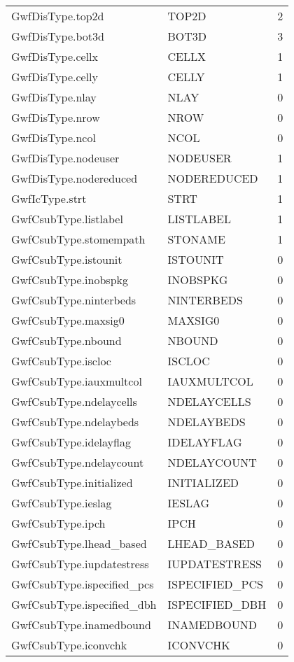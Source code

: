 \begin{longtable}{p{6cm} p{4cm} p{2cm} }
GwfDisType.top2d &  TOP2D & 2 \\ 
GwfDisType.bot3d &  BOT3D & 3 \\ 
GwfDisType.cellx &  CELLX & 1 \\ 
GwfDisType.celly &  CELLY & 1 \\ 
GwfDisType.nlay &  NLAY & 0 \\ 
GwfDisType.nrow &  NROW & 0 \\ 
GwfDisType.ncol &  NCOL & 0 \\ 
GwfDisType.nodeuser &  NODEUSER & 1 \\ 
GwfDisType.nodereduced &  NODEREDUCED & 1 \\ 
GwfIcType.strt &  STRT & 1 \\ 
GwfCsubType.listlabel &  LISTLABEL & 1 \\ 
GwfCsubType.stomempath &  STONAME & 1 \\ 
GwfCsubType.istounit &  ISTOUNIT & 0 \\ 
GwfCsubType.inobspkg &  INOBSPKG & 0 \\ 
GwfCsubType.ninterbeds &  NINTERBEDS & 0 \\ 
GwfCsubType.maxsig0 &  MAXSIG0 & 0 \\ 
GwfCsubType.nbound &  NBOUND & 0 \\ 
GwfCsubType.iscloc &  ISCLOC & 0 \\ 
GwfCsubType.iauxmultcol &  IAUXMULTCOL & 0 \\ 
GwfCsubType.ndelaycells &  NDELAYCELLS & 0 \\ 
GwfCsubType.ndelaybeds &  NDELAYBEDS & 0 \\ 
GwfCsubType.idelayflag &  IDELAYFLAG & 0 \\ 
GwfCsubType.ndelaycount &  NDELAYCOUNT & 0 \\ 
GwfCsubType.initialized &  INITIALIZED & 0 \\ 
GwfCsubType.ieslag &  IESLAG & 0 \\ 
GwfCsubType.ipch &  IPCH & 0 \\ 
GwfCsubType.lhead\_based &  LHEAD\_BASED & 0 \\ 
GwfCsubType.iupdatestress &  IUPDATESTRESS & 0 \\ 
GwfCsubType.ispecified\_pcs &  ISPECIFIED\_PCS & 0 \\ 
GwfCsubType.ispecified\_dbh &  ISPECIFIED\_DBH & 0 \\ 
GwfCsubType.inamedbound &  INAMEDBOUND & 0 \\ 
GwfCsubType.iconvchk &  ICONVCHK & 0 \\ 

\end{longtable}
